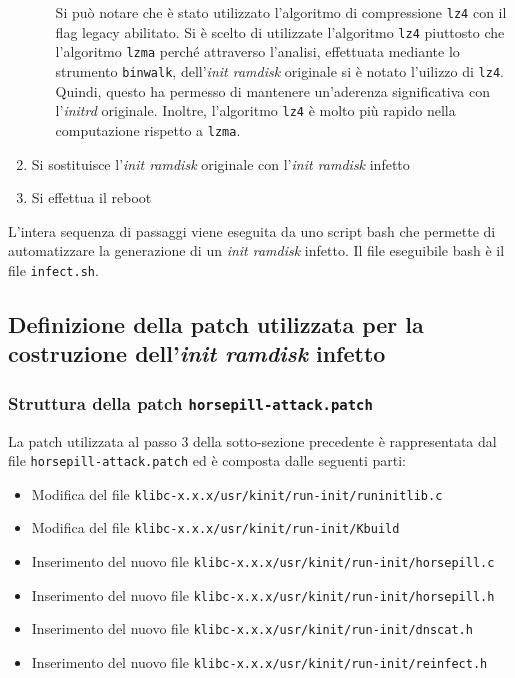 \documentclass[oneside]{article}
\begin{document}
\begin{enumerate}
\begin{enumerate}
Si può notare che è stato utilizzato l'algoritmo di compressione \texttt{lz4} con il flag legacy abilitato. Si è scelto di utilizzate l'algoritmo \texttt{lz4} piuttosto che l'algoritmo \texttt{lzma} perché attraverso l'analisi, effettuata mediante lo strumento \texttt{binwalk}, dell'\textit{init ramdisk} originale si è notato l'uilizzo di \texttt{lz4}. Quindi, questo ha permesso di mantenere un'aderenza significativa con l'\textit{initrd} originale. Inoltre, l'algoritmo \texttt{lz4} è molto più rapido nella computazione rispetto a \texttt{lzma}.
\end{enumerate}
\item Si sostituisce l'\textit{init ramdisk} originale con l'\textit{init ramdisk} infetto
\item Si effettua il reboot
\end{enumerate}

L'intera sequenza di passaggi viene eseguita da uno script bash che permette di automatizzare la generazione di un \textit{init ramdisk} infetto. Il file eseguibile bash è il file \texttt{infect.sh}.

\subsection{Definizione della patch utilizzata per la costruzione dell'\textit{init ramdisk} infetto}
\subsubsection{Struttura della patch \texttt{horsepill-attack.patch}}
La patch utilizzata al passo 3 della sotto-sezione precedente è rappresentata dal file \texttt{horsepill-attack.patch} ed è composta dalle seguenti parti:
\begin{itemize}
\item Modifica del file \texttt{klibc-x.x.x/usr/kinit/run-init/runinitlib.c}
\item Modifica del file \texttt{klibc-x.x.x/usr/kinit/run-init/Kbuild}
\item Inserimento del nuovo file \texttt{klibc-x.x.x/usr/kinit/run-init/horsepill.c}
\item Inserimento del nuovo file \texttt{klibc-x.x.x/usr/kinit/run-init/horsepill.h}
\item Inserimento del nuovo file \texttt{klibc-x.x.x/usr/kinit/run-init/dnscat.h}
\item Inserimento del nuovo file \texttt{klibc-x.x.x/usr/kinit/run-init/reinfect.h}
\end{itemize}
\end{document}
